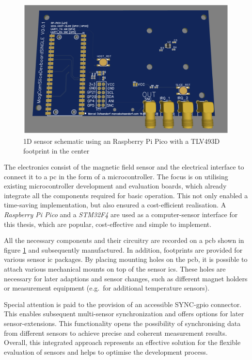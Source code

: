 \begin{figure}
\centering
\includegraphics{./generated_images/border_1D_sensor_schematic_using_an_Raspberry_Pi_Pico_with_a_TLV493D_footprint_in_the_center.png}
\caption{1D sensor schematic using an Raspberry Pi Pico with a TLV493D
footprint in the center
\label{1D_sensor_schematic_using_an_Raspberry_Pi_Pico_with_a_TLV493D_footprint_in_the_center.png}}
\end{figure}

The electronics consist of the magnetic field sensor and the electrical
interface to connect it to a \gls{pc} in the form of a microcontroller.
The focus is on utilising existing microcontroller development and
evaluation boards, which already integrate all the components required
for basic operation. This not only enabled a time-saving implementation,
but also ensured a cost-efficient realisation. A \emph{Raspberry Pi
Pico} and a \emph{STM32F4} are used as a computer-sensor interface for
this thesis, which are popular, cost-effective and simple to implement.

All the necessary components and their circuitry are recorded on a
\gls{pcb} shown in figure
\ref{1D_sensor_schematic_using_an_Raspberry_Pi_Pico_with_a_TLV493D_footprint_in_the_center.png}
and subsequently manufactured. In addition, footprints are provided for
various sensor \gls{ic} packages. By placing mounting holes on the
\gls{pcb}, it is possible to attach various mechanical mounts on top of
the sensor \gls{ic}s. These holes are necessary for later adaptions and
sensor changes, such as different magnet holders or measurement
equipment (e.g.~for additional temperature sensors).

Special attention is paid to the provision of an accessible
SYNC-\gls{gpio} connector. This enables subsequent multi-sensor
synchronization and offers options for later sensor-extensions. This
functionality opens the possibility of synchronising data from different
sensors to achieve precise and coherent measurement results. Overall,
this integrated approach represents an effective solution for the
flexible evaluation of sensors and helps to optimise the development
process.

